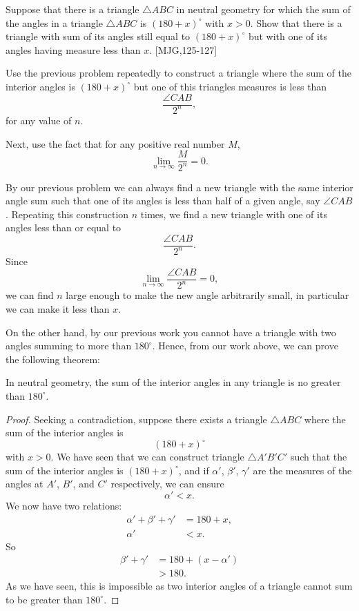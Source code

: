 \documentclass[instructornotes]{ximera}
\begin{document}
\begin{problem}
\label{121} Suppose that there is a triangle $\triangle ABC$ in
neutral geometry for which the sum of the angles in a triangle $\triangle
ABC$ is $\left( 180+x\right)^\circ$ with $x>0$. Show that there is a
triangle with sum of its angles still equal to $\left(180+x\right)^\circ$
but with one of its angles having measure less than $x$. [MJG,125-127]


\begin{hint}
Use the previous problem repeatedly to construct a triangle where the sum of the
interior angles is $(180+x)^\circ$ but one of this triangles measures is less than
\[
\frac{\angle CAB}{2^n},
\]
for any value of $n$.
\end{hint}
\begin{hint}
Next, use the fact that for any positive real number $M$,
\[
\lim_{n\to \infty}\frac{M}{2^n} = 0.
\]
\end{hint}
\begin{freeResponse}
By our previous problem we can always find a new triangle with the
same interior angle sum such that one of its angles is less than half
of a given angle, say $\angle CAB$. Repeating this construction $n$
times, we find a new triangle with one of its angles less than or
equal to
\[
\frac{\angle CAB}{2^n}.
\]
Since 
\[
\lim_{n\to \infty}\frac{\angle CAB}{2^n} = 0,
\]
we can find $n$ large enough to make the new angle arbitrarily small, in
particular we can make it less than $x$.
\end{freeResponse}

\end{problem}


On the other hand, by our previous work
you cannot have a triangle with two angles summing to more than
$180^\circ$. Hence, from our work above, we can prove the following
theorem:

\begin{theorem}
In neutral geometry, the sum of the interior angles in any triangle is no greater
than $180^\circ$.
\end{theorem}

\begin{proof}
Seeking a contradiction, suppose there exists a triangle $\triangle
ABC$ where the sum of the interior angles is 
\[
\left(180+x\right)^\circ
\]
with $x>0$. We have seen that we can construct triangle $\triangle
A'B'C'$ such that the sum of the interior angles is $(180+x)^\circ$,
and if $\alpha'$, $\beta'$, $\gamma'$ are the measures of the angles
at $A'$, $B'$, and $C'$ respectively, we can ensure 
\[
\alpha' < x.
\]
We now have two relations:
\begin{align*}
\alpha' + \beta' + \gamma' &= 180 + x,\\
\alpha' &< x.
\end{align*}
So%
\begin{align*}
\beta'+\gamma'&=180+\left(x-\alpha'\right)\\
&>180.
\end{align*}
As we have seen, this is impossible as two interior angles of a
triangle cannot sum to be greater than $180^\circ$.
\end{proof}
\end{document}
